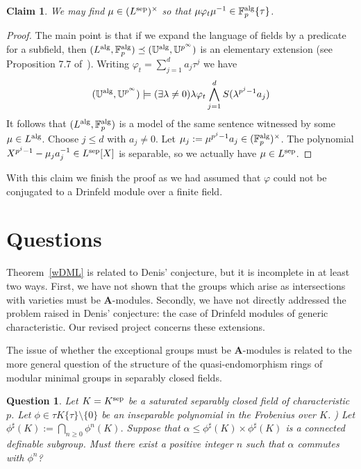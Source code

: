 \documentclass{amsart}
\newcommand{\FF}{{\mathbb F}}
\newcommand{\UU}{{\mathbb U}}
\newcommand{\alg}{{\rm alg}}
\newcommand{\sep}{{\rm sep}}
\newtheorem{claim}[thm]{Claim}
\newtheorem{question}[thm]{Question}
\theoremstyle{definition}
\theoremstyle{remark}
\begin{document}
\begin{claim}
We may find $\mu \in (L^\sep)^\times$ so that $\mu \varphi_t \mu^{-1} \in \FF_p^\alg \{ \tau \}$.
\end{claim}

\begin{proof}
The main point is that if we expand the language of fields by a predicate  for a subfield, then 
$(L^\alg,\FF_p^\alg) \preceq (\UU^\alg, \UU^{p^\infty})$ is an elementary extension (see Proposition 7.7 
of~\cite{MoSc}).  Writing $\varphi_t = \sum_{j=1}^d a_j \tau^j$  we have
$$(\UU^\alg, \UU^{p^\infty}) \models (\exists \lambda \neq 0) \lambda \varphi_t \bigwedge_{j=1}^d S(\lambda^{p^j-1} a_j)$$
It follows that $(L^\alg, \FF_p^\alg)$ is a model of the same sentence witnessed by some 
$\mu \in L^\alg$.  Choose $j \leq d$ with $a_j \neq 0$. Let $\mu_j := \mu^{p^j-1} a_j \in (\FF_p^\alg)^\times$. 
The polynomial $X^{p^j-1} - \mu_j a_j^{-1} \in L^\sep[X]$ is separable, so we actually have
$\mu \in L^\sep$.
\end{proof}

With this claim we finish the proof as we had assumed that $\varphi$ could not be conjugated to a 
Drinfeld module over a finite field.



\section{Questions}
\label{q}

Theorem~\ref{wDML} is related to Denis' conjecture, but it is incomplete in at least two ways.  
First, we have not shown that the groups which arise as intersections with varieties must be 
${\mathbf A}$-modules.  Secondly, we have not directly addressed the problem raised in Denis' conjecture: the 
case of Drinfeld modules of generic characteristic.  Our revised project concerns these extensions. 

The issue of whether the exceptional groups must be ${\mathbf A}$-modules is related to the more 
general question of the structure of the quasi-endomorphism rings of modular minimal groups in 
separably closed fields. 


\begin{question}
\label{quasiend}
Let $K = K^\sep$ be a saturated separably closed field of characteristic $p$.
Let $\phi \in \tau K \{ \tau \} \setminus \{0 \}$ be an inseparable 
polynomial in the Frobenius over $K$.  )
Let $\phi^\sharp(K) := \bigcap_{n \geq 0} \phi^n(K)$.  Suppose that
$\alpha \leq \phi^\sharp(K) \times \phi^\sharp(K)$ is a connected definable subgroup.
Must there exist a positive integer $n$ such that $\alpha$ commutes with 
$\phi^n$?
\end{question}
\end{document}
